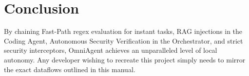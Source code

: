 \documentclass[11pt,a4paper]{report}
\begin{document}
\chapter{Conclusion}
By chaining Fast-Path regex evaluation for instant tasks, RAG injections in the Coding Agent, Autonomous Security Verification in the Orchestrator, and strict security interceptors, OmniAgent achieves an unparalleled level of local autonomy. Any developer wishing to recreate this project simply needs to mirror the exact dataflows outlined in this manual.
\end{document}
